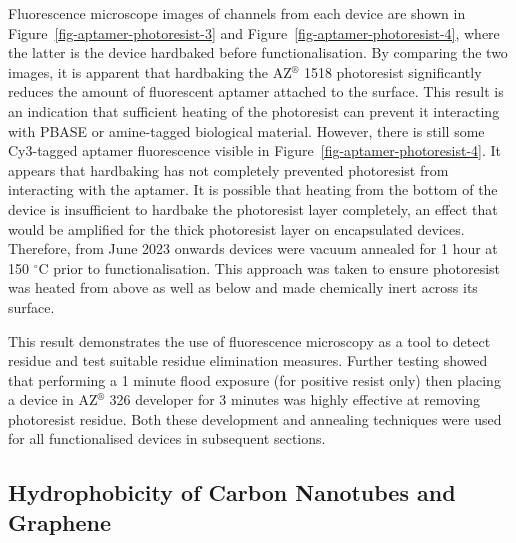 \documentclass[
  a4paper,
]{scrbook}
\begin{document}
Fluorescence microscope images of channels from each device are shown in
Figure~\ref{fig-aptamer-photoresist-3} and
Figure~\ref{fig-aptamer-photoresist-4}, where the latter is the device
hardbaked before functionalisation. By comparing the two images, it is
apparent that hardbaking the AZ\(^\circledR\) 1518 photoresist
significantly reduces the amount of fluorescent aptamer attached to the
surface. This result is an indication that sufficient heating of the
photoresist can prevent it interacting with PBASE or amine-tagged
biological material. However, there is still some Cy3-tagged aptamer
fluorescence visible in Figure~\ref{fig-aptamer-photoresist-4}. It
appears that hardbaking has not completely prevented photoresist from
interacting with the aptamer. It is possible that heating from the
bottom of the device is insufficient to hardbake the photoresist layer
completely, an effect that would be amplified for the thick photoresist
layer on encapsulated devices. Therefore, from June 2023 onwards devices
were vacuum annealed for 1 hour at 150 \(^\circ\)C prior to
functionalisation. This approach was taken to ensure photoresist was
heated from above as well as below and made chemically inert across its
surface.

This result demonstrates the use of fluorescence microscopy as a tool to
detect residue and test suitable residue elimination measures. Further
testing showed that performing a 1 minute flood exposure (for positive
resist only) then placing a device in AZ\(^\circledR\) 326 developer for
3 minutes was highly effective at removing photoresist residue. Both
these development and annealing techniques were used for all
functionalised devices in subsequent sections.

\hypertarget{sec-hydrophobicity}{%
\subsection{Hydrophobicity of Carbon Nanotubes and
Graphene}\label{sec-hydrophobicity}}
\end{document}
